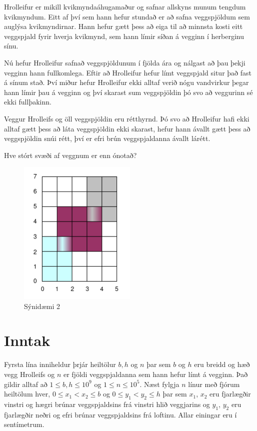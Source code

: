 
\noindent
Hrolleifur er mikill kvikmyndaáhugamaður og safnar allskyns munum
tengdum kvikmyndum. Eitt af því sem hann hefur stundað er að safna
veggspjöldum sem auglýsa kvikmyndirnar. Hann hefur gætt þess að eiga
til að minnsta kosti eitt veggspjald fyrir hverja kvikmynd, sem hann
límir síðan á vegginn í herberginu sínu.

Nú hefur Hrolleifur safnað veggspjöldunum í fjölda ára og nálgast að
þau þekji vegginn hann fullkomlega. Eftir að Hrolleifur hefur límt veggspjald
situr það fast á sínum stað. Því miður hefur Hrolleifur ekki alltaf
verið nógu vandvirkur þegar hann límir þau á vegginn og því skarast
sum veggspjöldin þó svo að veggurinn sé ekki fullþakinn.

Veggur Hrolleifs og öll veggspjöldin eru rétthyrnd. Þó svo að
Hrolleifur hafi ekki alltaf gætt þess að láta veggspjöldin ekki 
skarast, hefur hann ávallt gætt þess að veggspjöldin snúi rétt,
því er efri brún veggspjaldanna ávallt lárétt.

Hve stórt svæði af veggnum er enn ónotað?

\begin{figure}[h!]
  \centering
    \includegraphics[width=0.5\textwidth]{sample2}
  \caption{Sýnidæmi 2}
\end{figure}

\section*{Inntak}
Fyrsta lína inniheldur þrjár heiltölur $b, h$ og $n$ þar sem
$b$ og $h$ eru breidd og hæð vegg Hrolleifs og $n$ er fjöldi
veggspjaldanna sem hann hefur límt á vegginn. Það gildir alltaf
að $1 \leq b,h \leq 10^9$ og $1 \leq n \leq 10^5$.
Næst fylgja $n$ línur með fjórum heiltölum hver,
$0 \leq x_1 < x_2 \leq b$ og $0 \leq y_1 < y_2 \leq h$ þar sem
$x_1$, $x_2$ eru fjarlægðir vinstri og hægri brúnar veggspjaldsins
frá vinstri hlið veggjarins og $y_1$, $y_2$ eru fjarlægðir neðri
og efri brúnar veggspjaldsins frá loftinu. Allar einingar eru 
í sentímetrum.

